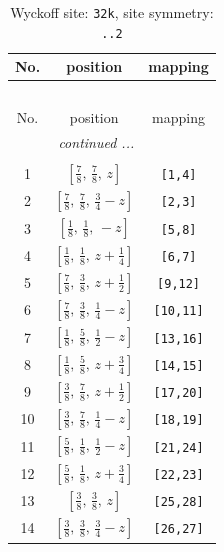 \documentclass[fleqn,8pt]{jsarticle}
\begin{document}
\begin{longtable}{ccc}
\caption{Wyckoff site: {\tt 32k}, site symmetry: {\tt ..2}}
 \\
 \hline \hline
No. & position & mapping \\ \hline \endfirsthead

\multicolumn{2}{l}{\tablename\ \thetable{}} \\
 \hline \hline
No. & position & mapping \\ \hline \endhead

 \hline \hline
\multicolumn{2}{r}{\footnotesize\it continued ...} \\ \endfoot

 \hline \hline
\multicolumn{2}{r}{} \\ \endlastfoot

1 & $\left[ \frac{7}{8},\, \frac{7}{8},\, z \right]$ & {\tt [1,4]} \\ \hline
2 & $\left[ \frac{7}{8},\, \frac{7}{8},\, \frac{3}{4} - z \right]$ & {\tt [2,3]} \\ \hline
3 & $\left[ \frac{1}{8},\, \frac{1}{8},\, - z \right]$ & {\tt [5,8]} \\ \hline
4 & $\left[ \frac{1}{8},\, \frac{1}{8},\, z + \frac{1}{4} \right]$ & {\tt [6,7]} \\ \hline
5 & $\left[ \frac{7}{8},\, \frac{3}{8},\, z + \frac{1}{2} \right]$ & {\tt [9,12]} \\ \hline
6 & $\left[ \frac{7}{8},\, \frac{3}{8},\, \frac{1}{4} - z \right]$ & {\tt [10,11]} \\ \hline
7 & $\left[ \frac{1}{8},\, \frac{5}{8},\, \frac{1}{2} - z \right]$ & {\tt [13,16]} \\ \hline
8 & $\left[ \frac{1}{8},\, \frac{5}{8},\, z + \frac{3}{4} \right]$ & {\tt [14,15]} \\ \hline
9 & $\left[ \frac{3}{8},\, \frac{7}{8},\, z + \frac{1}{2} \right]$ & {\tt [17,20]} \\ \hline
10 & $\left[ \frac{3}{8},\, \frac{7}{8},\, \frac{1}{4} - z \right]$ & {\tt [18,19]} \\ \hline
11 & $\left[ \frac{5}{8},\, \frac{1}{8},\, \frac{1}{2} - z \right]$ & {\tt [21,24]} \\ \hline
12 & $\left[ \frac{5}{8},\, \frac{1}{8},\, z + \frac{3}{4} \right]$ & {\tt [22,23]} \\ \hline
13 & $\left[ \frac{3}{8},\, \frac{3}{8},\, z \right]$ & {\tt [25,28]} \\ \hline
14 & $\left[ \frac{3}{8},\, \frac{3}{8},\, \frac{3}{4} - z \right]$ & {\tt [26,27]} \\ \hline

\end{longtable}
\end{document}
